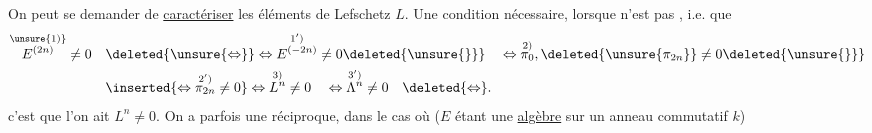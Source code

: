 On peut se demander de \uline{caractériser} les  éléments de Lefschetz $L$. Une condition nécessaire, lorsque   n'est pas , i.e. que
\[
\begin{aligned}
\overset{\unsure{1)}}{E^{(2n)}}\ne0\quad&\deleted{\unsure{\Leftrightarrow}}\Leftrightarrow\overset{1')}{E^{(-2n)}}\ne0\deleted{\unsure{\}}}
\quad\Leftrightarrow\overset{2)}{\pi_0},\deleted{\unsure{\pi_{2n}}}\ne0\deleted{\unsure{\}}}\\
&\inserted{\Leftrightarrow\overset{2')}{\pi_{2n}}\ne0}
\Leftrightarrow\overset{3)}{L^n}\ne0\quad\Leftrightarrow\overset{3')}{\Lambda^n}\ne0\quad\deleted{\Leftrightarrow}.
\end{aligned}
\]
c'est que l'on ait $L^n\ne0$. On a parfois une réciproque, dans le cas où ($E$ étant une \uline{algèbre} sur un anneau commutatif $k$)
